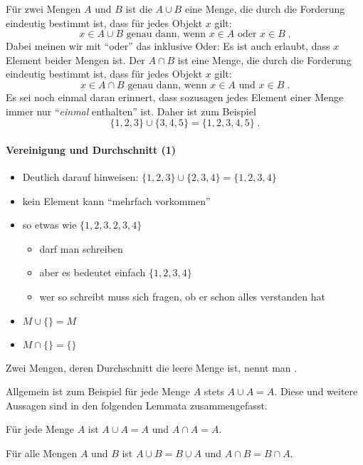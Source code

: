 Für zwei Mengen $A$ und $B$ ist die  $A\cup B$
eine Menge, die durch die Forderung eindeutig bestimmt ist, dass für
jedes Objekt $x$ gilt:
\[
  x\in A \cup B \text{ genau dann, wenn } x\in A \text{ oder } x \in B \;.
\]
Dabei meinen wir mit "`oder"' das inklusive Oder:
%
Es ist auch erlaubt, dass $x$ Element beider Mengen ist.
%
Der  $A\cap B$
ist eine Menge, die durch die Forderung eindeutig bestimmt ist, dass für jedes Objekt $x$ gilt:
\[
  x\in A \cap B \text{ genau dann, wenn } x\in A \text{ und } x \in B \;.
\]
%
Es sei noch einmal daran erinnert, dass sozusagen jedes Element einer
Menge immer nur "`\emph{einmal} enthalten"' ist.
%
Daher ist zum Beispiel
\[
  \{ 1,2,3\} \cup \{3,4,5\} = \{1,2,3,4,5\} \;.
\]
%
\begin{tutorium}
  \paragraph{Vereinigung und Durchschnitt (1)}

  \begin{itemize}
  \item Deutlich darauf hinweisen: $\{ 1,2,3\} \cup \{2,3,4\}= \{1,2,3,4\}$
  \item kein Element kann "`mehrfach vorkommen"'
  \item so etwas wie $\{1,2,3,2,3,4\}$
    \begin{itemize}
    \item darf man schreiben
    \item aber es bedeutet einfach $\{1,2,3,4\}$
    \item wer so schreibt muss sich fragen, ob er schon alles
      verstanden hat
    \end{itemize}
  \item $M \cup \{\} = M$
  \item $M \cap \{\} = \{\}$
  \end{itemize}
\end{tutorium}
%
Zwei Mengen, deren Durchschnitt die leere Menge ist, nennt man .

Allgemein ist zum Beispiel für jede Menge $A$ stets $A\cup A=A$.
%
Diese und weitere Aussagen sind in den folgenden Lemmata
zusammengefasst.
%
\begin{lemma}
  \label{lem:mengen-idempotenz}
  Für jede Menge $A$ ist $A\cup A=A$ und $A\cap A=A$.
\end{lemma}

\begin{lemma}
  \label{lem:mengen-kommutativitaet}
  Für alle Mengen $A$ und $B$ ist $A\cup B=B\cup A$ und
  $A\cap B = B\cap A$.
\end{lemma}

